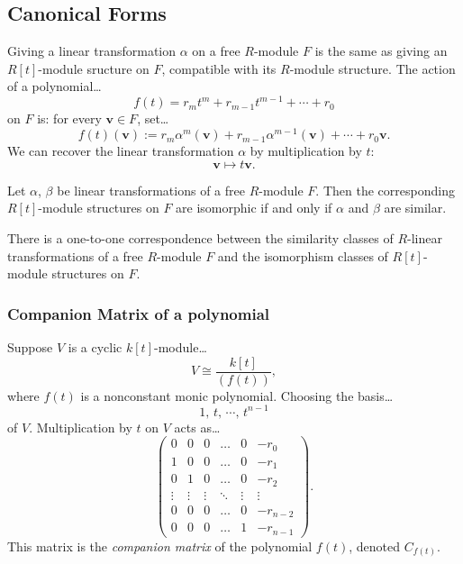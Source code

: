 \subsection{Canonical Forms}

Giving a linear transformation $\alpha$ on a free $R$-module $F$ is the same as giving an $R[t]$-module
sructure on $F$, compatible with its $R$-module structure. The action of a polynomial\dots
$$f(t) = r_mt^m + r_{m-1}t^{m-1} + \cdots + r_0$$
on $F$ is: for every $\textbf{v} \in F$, set\dots
$$f(t)(\textbf{v}) := r_m\alpha^m(\textbf{v}) + r_{m-1}\alpha^{m-1}(\textbf{v}) + \cdots + r_0 \textbf{v}.$$
We can recover the linear transformation $\alpha$ by multiplication by $t$:
$$\textbf{v} \mapsto t\textbf{v}.$$

\begin{lemma}
Let $\alpha$, $\beta$ be linear transformations of a free $R$-module $F$. Then the corresponding $R[t]$-module
structures on $F$ are isomorphic if and only if $\alpha$ and $\beta$ are similar.
\end{lemma}

\begin{corollary}
There is a one-to-one correspondence between the similarity classes of $R$-linear transformations of a free $R$-module
$F$ and the isomorphism classes of $R[t]$-module structures on $F$.
\end{corollary}

\subsubsection{Companion Matrix of a polynomial}\label{companionmatrix}
Suppose $V$ is a cyclic $k[t]$-module\dots
$$V \cong \frac{k[t]}{(f(t))},$$
where $f(t)$ is a nonconstant monic polynomial. Choosing the basis\dots
$$1, \, t, \, \cdots, \, t^{n-1}$$
of $V$. Multiplication by $t$ on $V$ acts as\dots
\[
\begin{pmatrix}
0 & 0 & 0 & \dots & 0 & -r_0\\
1 & 0 & 0 & \dots & 0 & -r_1\\
0 & 1 & 0 & \dots & 0 & -r_2\\
\vdots & \vdots & \vdots & \ddots & \vdots & \vdots\\
0 & 0 & 0 & \dots & 0 & -r_{n-2}\\
0 & 0 & 0 & \dots & 1 & -r_{n-1}
\end{pmatrix}.
\]
This matrix is the \emph{companion matrix} of the polynomial $f(t)$, denoted $C_{f(t)}$.\newline

